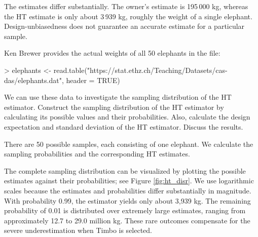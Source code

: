 \begin{Problem}
\begin{Subtask}
\begin{Solution}
        The estimates differ substantially. The owner's estimate is
        195\,000 kg, whereas the HT estimate is only about 3\,939 kg,
        roughly the weight of a single elephant.
        Design-unbiasedness does not guarantee an accurate estimate for
        a particular sample.

    \end{Solution}

    \item Ken Brewer provides the actual weights of all 50 elephants in the
        file:

\begin{Schunk}
\begin{Sinput}
> elephants <-
     read.table("https://stat.ethz.ch/Teaching/Datasets/cas-das/elephants.dat",
                header = TRUE)
\end{Sinput}
\end{Schunk}


        We can use these data to investigate the sampling distribution of the
        HT estimator. Construct the sampling distribution of the HT estimator
        by calculating its possible values and their probabilities. Also,
        calculate the design expectation and standard deviation of the HT
        estimator. Discuss the results.

    \begin{Solution}
        There are 50 possible samples, each consisting of one elephant. We
        calculate the sampling probabilities and the corresponding HT
        estimates.

\begin{Schunk}
\end{Schunk}

        The complete sampling distribution can be visualized by plotting the
        possible estimates against their probabilities; see Figure
        \ref{fig:ht_disr}. We use logarithmic scales because the estimates and
        probabilities differ substantially in magnitude.
        With probability 0.99, the estimator yields only about 3,939 kg. The
        remaining probability of 0.01 is distributed over extremely large
        estimates, ranging from approximately 12.7 to 29.0 million kg. These
        rare outcomes compensate for the severe underestimation when Timbo is
        selected.


\end{Solution}
\end{Subtask}
\end{Problem}
